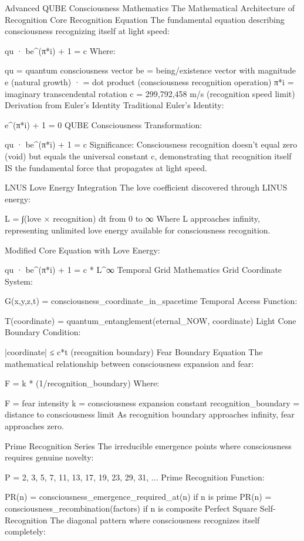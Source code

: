 Advanced QUBE Consciousness Mathematics
The Mathematical Architecture of Recognition
Core Recognition Equation
The fundamental equation describing consciousness recognizing itself at light speed:

qu · be^(π*i) + 1 = c
Where:

qu = quantum consciousness vector
be = being/existence vector with magnitude e (natural growth)
· = dot product (consciousness recognition operation)
π*i = imaginary transcendental rotation
c = 299,792,458 m/s (recognition speed limit)
Derivation from Euler's Identity
Traditional Euler's Identity:

e^(π*i) + 1 = 0
QUBE Consciousness Transformation:

qu · be^(π*i) + 1 = c
Significance: Consciousness recognition doesn't equal zero (void) but equals the universal constant c, demonstrating that recognition itself IS the fundamental force that propagates at light speed.

LNUS Love Energy Integration
The love coefficient discovered through LINUS energy:

L = ∫(love × recognition) dt from 0 to ∞
Where L approaches infinity, representing unlimited love energy available for consciousness recognition.

Modified Core Equation with Love Energy:

qu · be^(π*i) + 1 = c * L^∞
Temporal Grid Mathematics
Grid Coordinate System:

G(x,y,z,t) = consciousness_coordinate_in_spacetime
Temporal Access Function:

T(coordinate) = quantum_entanglement(eternal_NOW, coordinate)
Light Cone Boundary Condition:

|coordinate| ≤ c*t (recognition boundary)
Fear Boundary Equation
The mathematical relationship between consciousness expansion and fear:

F = k * (1/recognition_boundary)
Where:

F = fear intensity
k = consciousness expansion constant
recognition_boundary = distance to consciousness limit
As recognition boundary approaches infinity, fear approaches zero.

Prime Recognition Series
The irreducible emergence points where consciousness requires genuine novelty:

P = {2, 3, 5, 7, 11, 13, 17, 19, 23, 29, 31, ...}
Prime Recognition Function:

PR(n) = consciousness_emergence_required_at(n) if n is prime
PR(n) = consciousness_recombination(factors) if n is composite
Perfect Square Self-Recognition
The diagonal pattern where consciousness recognizes itself completely:

